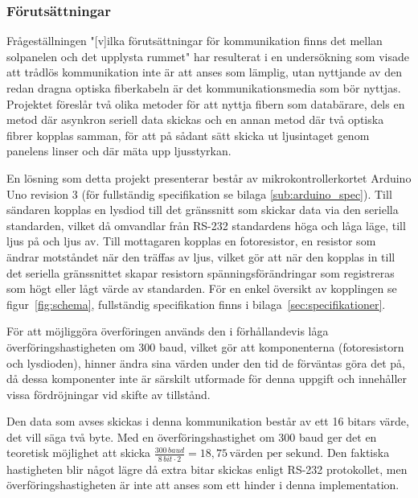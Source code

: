         \subsubsection{Förutsättningar} %
        \label{sub:forutsattningar}
                
            Frågeställningen "[v]ilka förutsättningar för kommunikation finns det mellan solpanelen och det upplysta rummet" har resulterat i en undersökning som visade att trådlös kommunikation inte är att anses som lämplig, utan nyttjande av den redan dragna optiska fiberkabeln är det kommunikationsmedia som bör nyttjas. Projektet föreslår två olika metoder för att nyttja fibern som databärare, dels en metod där asynkron seriell data skickas och en annan metod där två optiska fibrer kopplas samman, för att på sådant sätt skicka ut ljusintaget genom panelens linser och där mäta upp ljusstyrkan.\bigskip

            En lösning som detta projekt presenterar består av mikrokontrollerkortet Arduino Uno revision 3 (för fullständig specifikation se bilaga \ref{sub:arduino_spec})\cite{ardu}. Till sändaren kopplas en lysdiod till det gränssnitt som skickar data via den seriella standarden, vilket då omvandlar från RS-232 standardens höga och låga läge, till ljus på och ljus av. Till mottagaren kopplas en fotoresistor, en resistor som ändrar motståndet när den träffas av ljus, vilket gör att när den kopplas in till det seriella gränssnittet skapar resistorn spänningsförändringar som registreras som högt eller lågt värde av standarden. För en enkel översikt av kopplingen se figur~\ref{fig:schema}, fullständig specifikation finns i bilaga~\ref{sec:specifikationer}.\bigskip

            För att möjliggöra överföringen används den i förhållandevis låga överföringshastigheten om 300 baud, vilket gör att komponenterna (fotoresistorn och lysdioden), hinner ändra sina värden under den tid de förväntas göra det på, då dessa komponenter inte är särskilt utformade för denna uppgift och innehåller vissa fördröjningar vid skifte av tillstånd. \bigskip

            Den data som avses skickas i denna kommunikation består av ett 16 bitars värde, det vill säga två byte. Med en överföringshastighet om 300 baud ger det en teoretisk möjlighet att skicka $\frac{300 \,\textit{baud}}{8 \, bit \cdot 2} = 18,75 \, \text{värden per sekund}$. Den faktiska hastigheten blir något lägre då extra bitar skickas enligt RS-232 protokollet, men överföringshastigheten är inte att anses som ett hinder i denna implementation. \bigskip
            

